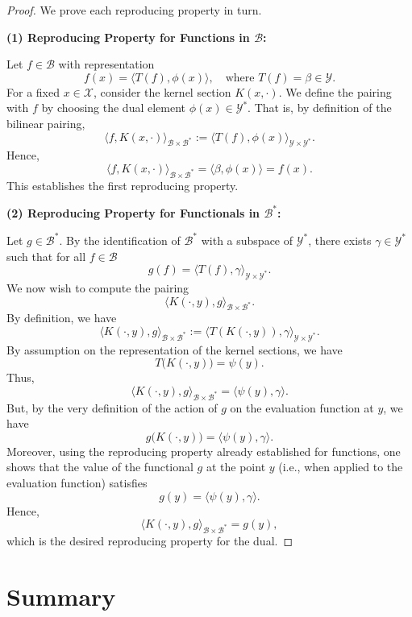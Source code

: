 \begin{proof}
We prove each reproducing property in turn.

\medskip

\noindent\textbf{(1) Reproducing Property for Functions in \(\mathcal{B}\):}  

Let \(f\in \mathcal{B}\) with representation
\[
f(x)= \langle T(f), \phi(x)\rangle, \quad \text{where } T(f)= \beta \in \mathcal{Y}.
\]
For a fixed \(x\in\mathcal{X}\), consider the kernel section \(K(x,\cdot)\). We define the pairing with \(f\) by choosing the dual element \(\phi(x)\in \mathcal{Y}^*\). That is, by definition of the bilinear pairing,
\[
\langle f, K(x,\cdot)\rangle_{\mathcal{B}\times \mathcal{B}^*} := \langle T(f), \phi(x)\rangle_{\mathcal{Y}\times \mathcal{Y}^*}.
\]
Hence,
\[
\langle f, K(x,\cdot)\rangle_{\mathcal{B}\times \mathcal{B}^*} = \langle \beta, \phi(x)\rangle = f(x).
\]
This establishes the first reproducing property.

\medskip

\noindent\textbf{(2) Reproducing Property for Functionals in \(\mathcal{B}^*\):}  

Let \(g\in\mathcal{B}^*\). By the identification of \(\mathcal{B}^*\) with a subspace of \(\mathcal{Y}^*\), there exists \(\gamma\in \mathcal{Y}^*\) such that for all \(f\in\mathcal{B}\)
\[
g(f)= \langle T(f), \gamma\rangle_{\mathcal{Y}\times \mathcal{Y}^*}.
\]
We now wish to compute the pairing
\[
\langle K(\cdot,y), g \rangle_{\mathcal{B}\times \mathcal{B}^*}.
\]
By definition, we have
\[
\langle K(\cdot,y), g \rangle_{\mathcal{B}\times \mathcal{B}^*} := \langle T(K(\cdot,y)), \gamma\rangle_{\mathcal{Y}\times \mathcal{Y}^*}.
\]
By assumption on the representation of the kernel sections, we have
\[
T\bigl(K(\cdot,y)\bigr)= \psi(y).
\]
Thus,
\[
\langle K(\cdot,y), g \rangle_{\mathcal{B}\times \mathcal{B}^*} = \langle \psi(y), \gamma\rangle.
\]
But, by the very definition of the action of \(g\) on the evaluation function at \(y\), we have
\[
g\bigl(K(\cdot,y)\bigr) = \langle \psi(y), \gamma\rangle.
\]
Moreover, using the reproducing property already established for functions, one shows that the value of the functional \(g\) at the point \(y\) (i.e., when applied to the evaluation function) satisfies
\[
g(y) = \langle \psi(y), \gamma\rangle.
\]
Hence,
\[
\langle K(\cdot,y), g \rangle_{\mathcal{B}\times \mathcal{B}^*} = g(y),
\]
which is the desired reproducing property for the dual.
\end{proof}

\section{Summary}

